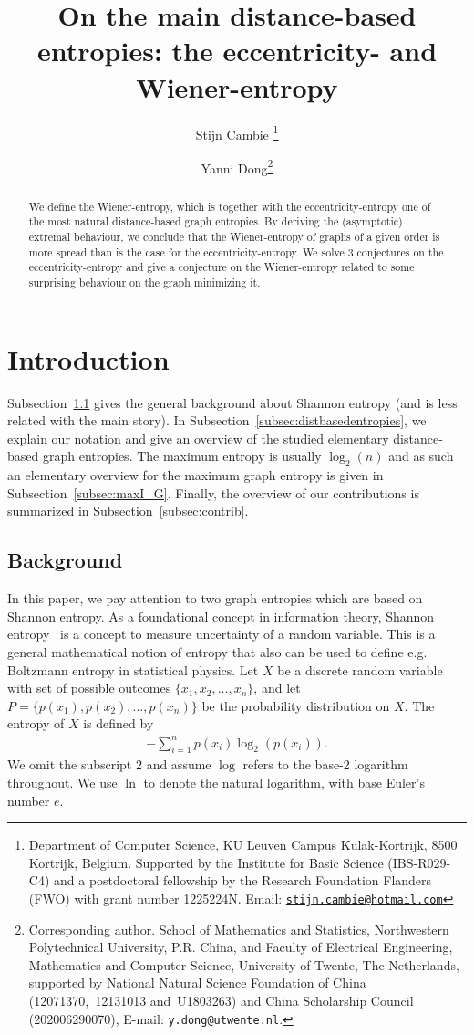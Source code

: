\documentclass{article}
\title{On the main distance-based entropies: the eccentricity- and Wiener-entropy}%
\author{Stijn Cambie \thanks{Department of Computer Science, KU Leuven Campus Kulak-Kortrijk, 8500 Kortrijk, Belgium. Supported by the Institute for Basic Science (IBS-R029-C4) and a postdoctoral fellowship by the Research Foundation Flanders (FWO) with grant number 1225224N. Email: \protect\href{mailto:stijn.cambie@hotmail.com}{\protect\nolinkurl{stijn.cambie@hotmail.com}}}
\and
Yanni Dong\thanks{Corresponding author. School of Mathematics and Statistics,
Northwestern Polytechnical University, P.R. China, and Faculty of Electrical Engineering, Mathematics and Computer Science, University of Twente, The Netherlands, supported by National Natural Science Foundation of China (12071370,~12131013 and~U1803263) and China Scholarship Council (202006290070),
E-mail: {\tt y.dong@utwente.nl}.
}
}
\date{}
\begin{document}
\maketitle
\begin{abstract}
    We define the Wiener-entropy, which is together with the eccentricity-entropy one of the most natural distance-based graph entropies.
    By deriving the (asymptotic) extremal behaviour, we conclude that the Wiener-entropy of graphs of a given order is more spread than is the case for the eccentricity-entropy.
    We solve $3$ conjectures on the eccentricity-entropy and give a conjecture on the Wiener-entropy related to some surprising behaviour on the graph minimizing it.
\end{abstract}

\section{Introduction}\label{sec:int}

Subsection~\ref{sub:background} gives the general background about Shannon entropy (and is less related with the main story). 
In Subsection~\ref{subsec:distbasedentropies}, we explain our notation and give an overview of the studied elementary distance-based graph entropies.
The maximum entropy is usually $\log_2(n)$ and as such an elementary overview for the maximum graph entropy is given in Subsection~\ref{subsec:maxI_G}. Finally, the overview of our contributions is summarized in Subsection~\ref{subsec:contrib}.


\subsection{Background}\label{sub:background}
In this paper, we pay attention to two graph entropies which are based on Shannon entropy. As a foundational concept in information theory, Shannon entropy~\cite{Shannon} is a concept to measure uncertainty of a random variable.
This is a general mathematical notion of entropy that also can be used to define e.g. Boltzmann entropy in statistical physics.
Let $X$ be a discrete random variable with set of possible outcomes $\{x_1,x_2,\ldots,x_n\}$, and let  $P=\{p(x_1),p(x_2),\ldots,p(x_n)\}$ be the probability distribution on $X$. The entropy of $X$ is defined by
\begin{align*}
-\sum_{i=1}^{n}p(x_i)\log_{2}(p(x_i)).
\end{align*}
We omit the subscript $2$ and assume $\log$ refers to the base-2 logarithm throughout. We use $\ln$ to denote the natural logarithm, with base Euler's number $e$.
\end{document}
